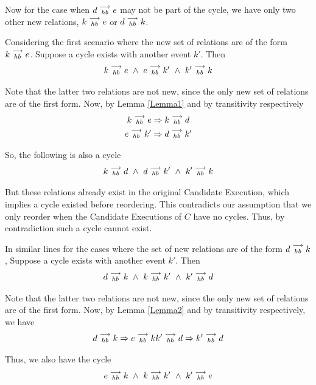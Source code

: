 
    Now for the case when $d\stackrel{\longrightarrow}{_{hb}}e$ may not be part of the cycle, we have only two other new relations, $k\stackrel{\longrightarrow}{_{hb}}e$ or $d\stackrel{\longrightarrow}{_{hb}}k$.

    Considering the first scenario where the new set of relations are of the form $k\stackrel{\longrightarrow}{_{hb}}e$. Suppose a cycle exists with another event $k'$. Then 
    \[
        k\stackrel{\longrightarrow}{_{hb}}e \ \wedge \
        e\stackrel{\longrightarrow}{_{hb}}k' \ \wedge \
        k'\stackrel{\longrightarrow}{_{hb}}k
    \]

    Note that the latter two relations are not new, since the only new set of relations are of the first form. Now, by Lemma \ref{Lemma1} and by transitivity respectively
    \begin{gather*}
        k\stackrel{\longrightarrow}{_{hb}}e \Rightarrow k\stackrel{\longrightarrow}{_{hb}}d \\
        e\stackrel{\longrightarrow}{_{hb}}k' \Rightarrow d\stackrel{\longrightarrow}{_{hb}}k'    
    \end{gather*}

    So, the following is also a cycle
    \[
        k\stackrel{\longrightarrow}{_{hb}}d \ \wedge \
        d\stackrel{\longrightarrow}{_{hb}}k' \ \wedge \
        k'\stackrel{\longrightarrow}{_{hb}}k
    \]

    But these relations already exist in the original Candidate Execution, which implies a cycle existed before reordering. 
    This contradicts our assumption that we only reorder when the Candidate Executions of $C$ have no cycles. 
    Thus, by contradiction such a cycle cannot exist.

    In similar lines for the cases where the set of new relations are of the form $d\stackrel{\longrightarrow}{_{hb}}k$,  Suppose a cycle exists with another event $k'$. Then 
    \begin{align*}
        \reln{d}{hb}{k} \ \wedge \
        \reln{k}{hb}{k'} \ \wedge \ 
        \reln{k'}{hb}{d} 
    \end{align*}

    Note that the latter two relations are not new, since the only new set of relations are of the first form. Now, by Lemma \ref{Lemma2} and by transitivity respectively, we have 
    \begin{align*}
        d\stackrel{\longrightarrow}{_{hb}}k \Rightarrow e\stackrel{\longrightarrow}{_{hb}}k
        k'\stackrel{\longrightarrow}{_{hb}}d \Rightarrow k'\stackrel{\longrightarrow}{_{hb}}d
    \end{align*}

    Thus, we also have the cycle 
    \begin{align*}
        \reln{e}{hb}{k} \ \wedge \
        \reln{k}{hb}{k'} \ \wedge \ 
        \reln{k'}{hb}{e} 
    \end{align*}


